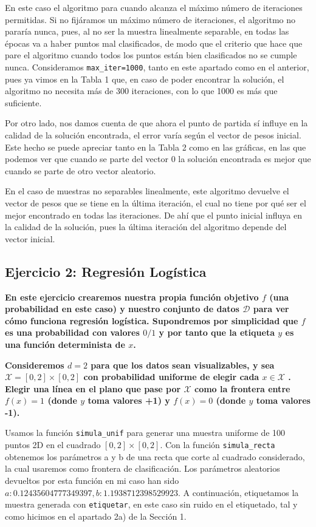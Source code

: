 \documentclass[a4]{article}
\begin{document}
En este caso el algoritmo para cuando alcanza el máximo número de iteraciones permitidas. Si no fijáramos un máximo número de iteraciones, el algoritmo no pararía nunca, pues, al no ser la muestra linealmente separable, en todas las épocas va a haber puntos mal clasificados, de modo que el criterio que hace que pare el algoritmo cuando todos los puntos están bien clasificados no se cumple nunca. Consideramos \lstinline|max_iter=1000|, tanto en este apartado como en el anterior, pues ya vimos en la Tabla 1 que, en caso de poder encontrar la solución, el algoritmo no necesita más de 300 iteraciones, con lo que 1000 es más que suficiente. 

Por otro lado, nos damos cuenta de que ahora el punto de partida sí influye en la calidad de la solución encontrada, el error varía según el vector de pesos inicial. Este hecho se puede apreciar tanto en la Tabla 2 como en las gráficas, en las que podemos ver que cuando se parte del vector 0 la solución encontrada es mejor que cuando se parte de otro vector aleatorio. 

En el caso de muestras no separables linealmente, este algoritmo devuelve el vector de pesos que se tiene en la última iteración, el cual no tiene por qué ser el mejor encontrado en todas las iteraciones. De ahí que el punto inicial influya en la calidad de la solución, pues la última iteración del algoritmo depende del vector inicial. 


\subsection{Ejercicio 2: Regresión Logística}
\textbf{En este ejercicio crearemos nuestra propia función
objetivo $ f $ (una probabilidad en este caso) y nuestro conjunto de datos $\mathcal{D}$ para ver cómo
funciona regresión logística. Supondremos por simplicidad que $ f $ es una probabilidad
con valores $ 0/1 $ y por tanto que la etiqueta $ y $ es una función determinista de $ x $.
}

\textbf{Consideremos $ d = 2 $ para que los datos sean visualizables, y sea $ \mathcal{X} = [0, 2] \times [0, 2] $ con
probabilidad uniforme de elegir cada $ x \in\mathcal{X} $ . Elegir una línea en el plano que pase por
 $ \mathcal{X} $ como la frontera entre $ f (x) = 1 $ (donde $ y $ toma valores +1) y $ f (x) = 0 $ (donde $ y $
toma valores -1).}

Usamos la función \lstinline|simula_unif| para generar una muestra uniforme de 100 puntos 2D en el cuadrado $ [0, 2] \times [0, 2] $. Con la función \lstinline|simula_recta| obtenemos los parámetros a y b de una recta que corte al cuadrado considerado, la cual usaremos como frontera de clasificación. Los parámetros aleatorios devueltos por esta función en mi caso han sido $a:  0.12435604777349397,  b: 1.1938712398529923$. 
A continuación, etiquetamos la muestra generada con \lstinline|etiquetar|, en este caso sin ruido en el etiquetado, tal y como hicimos en el apartado 2a) de la Sección 1. 
\end{document}
